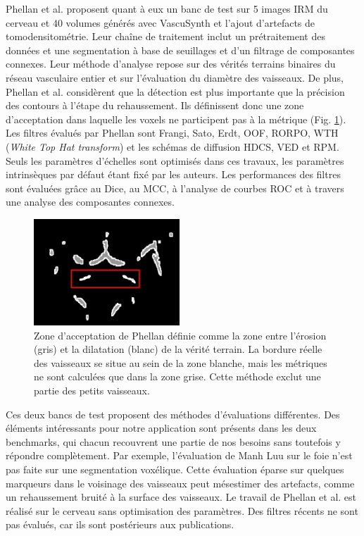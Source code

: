 Phellan et al. \cite{Phellan2017_Brain_vesselness_comparison} proposent quant à eux un banc de test sur 5 images IRM du cerveau et 40 volumes générés avec VascuSynth et l'ajout d'artefacts de tomodensitométrie. Leur chaîne de traitement inclut un prétraitement des données et une segmentation à base de seuillages et d'un filtrage de composantes connexes. Leur méthode d'analyse repose sur des vérités terrains binaires du réseau vasculaire entier et sur l'évaluation du diamètre des vaisseaux. De plus, Phellan et al. considèrent que la détection est plus importante que la précision des contours à l'étape du rehaussement. Ils définissent donc une zone d'acceptation dans laquelle les voxels ne participent pas à la métrique (Fig. \ref{fig:Phellan_acceptance_zone}). Les filtres évalués par Phellan sont Frangi, Sato, Erdt, OOF, RORPO, WTH (\textit{White Top Hat transform}) \cite{Soille1999_WTH} et les schémas de diffusion HDCS, VED et RPM. Seuls les paramètres d'échelles sont optimisés dans ces travaux, les paramètres intrinsèques par défaut étant fixé par les auteurs. Les performances des filtres sont évaluées grâce au Dice, au MCC, à l'analyse de courbes ROC et à travers une analyse des composantes connexes.
\begin{figure}[!ht]
  \centering
  \includegraphics[height=4cm]{Images/Phellan_comparison.jpg}
  \caption{Zone d'acceptation de Phellan définie comme la zone entre l'érosion (gris) et la dilatation (blanc) de la vérité terrain. La bordure réelle des vaisseaux se situe au sein de la zone blanche, mais les métriques ne sont calculées que dans la zone grise. Cette méthode exclut une partie des petits vaisseaux.}
  \label{fig:Phellan_acceptance_zone}
\end{figure}

Ces deux bancs de test proposent des méthodes d'évaluations différentes. Des éléments intéressants pour notre application sont présents dans les deux benchmarks, qui chacun recouvrent une partie de nos besoins sans toutefois y répondre complètement. Par exemple, l'évaluation de Manh Luu sur le foie n'est pas faite sur une segmentation voxélique. Cette évaluation éparse sur quelques marqueurs dans le voisinage des vaisseaux peut mésestimer des artefacts, comme un rehaussement bruité à la surface des vaisseaux. Le travail de Phellan et al. est réalisé sur le cerveau sans optimisation des paramètres. Des filtres récents ne sont pas évalués, car ils sont postérieurs aux publications. 


